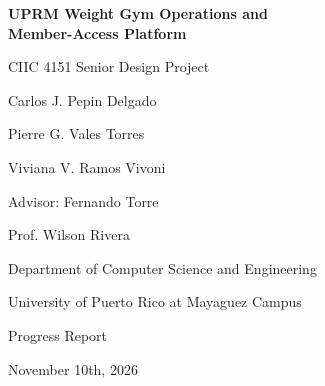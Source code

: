 \documentclass[11pt,letterpaper]{article}
\begin{document}
\begin{titlepage}
\thispagestyle{empty}
\centering
\vspace*{3.5cm}

{\LARGE\bfseries UPRM Weight Gym Operations and\\[0.3cm] Member-Access Platform\par}

\vspace{4cm}

{\large CIIC 4151 Senior Design Project\par}
\vspace{0.6cm}
{\large Carlos J. Pepin Delgado\par}
{\large Pierre G. Vales Torres\par}
{\large Viviana V. Ramos Vivoni\par}

\vspace{2cm}

{\large Advisor: Fernando Torre\par}
{\large Prof. Wilson Rivera\par}
\vspace{0.4cm}
{\large Department of Computer Science and Engineering\par}
{\large University of Puerto Rico at Mayaguez Campus\par}
\vspace{0.4cm}
{\large Progress Report\par}
\vspace{0.4cm}
{\large November 10th, 2026\par}

\vfill
\end{titlepage}











\end{document}
